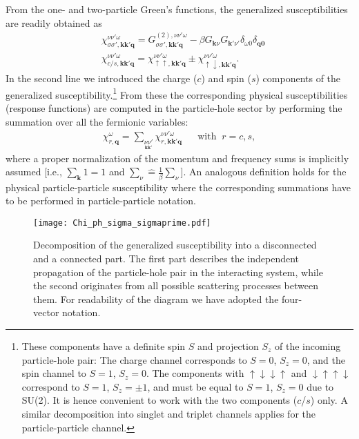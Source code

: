 \documentclass[rmp,aps,reprint,amsmath,amssymb,superscriptaddress,showpacs,nofootinbib]{revtex4-1}
\begin{document}
From the one- and two-particle Green's functions, the generalized  susceptibilities are readily obtained as
\begin{align} 
 \label{equ:defgensusc} 
 &\chi_{\sigma\sigma',\mathbf{k}\mathbf{k'}\mathbf{q}}^{\nu\nu'\omega}=G_{\sigma\sigma',\mathbf{k}\mathbf{k'}\mathbf{q}}^{(2),\nu\nu'\omega}-\beta G_{\mathbf{k}\nu}G_{\mathbf{k'}\nu'}\delta_{\omega 0}\delta_{\mathbf{q}\mathbf{0}}\nonumber\\
 &\chi_{c/s,\mathbf{k}\mathbf{k'}\mathbf{q}}^{\nu\nu'\omega}=\chi_{\uparrow\uparrow,\mathbf{k}\mathbf{k'}\mathbf{q}}^{\nu\nu'\omega}\pm\chi_{\uparrow\downarrow,\mathbf{k}\mathbf{k'}\mathbf{q}}^{\nu\nu'\omega}. 
\end{align}
In the second line we introduced the charge ($c$) and spin ($s$)  components of the generalized susceptibility.\footnote{These components have a definite spin $S$ and projection $S_z$ of the incoming particle-hole pair: The charge channel corresponds to $S=0$, $S_{z}=0$, and the spin channel to $S=1$, $S_{z}=0$. The components with $\uparrow\downarrow\downarrow\uparrow$ and $\downarrow\uparrow\uparrow\downarrow$ correspond to $S=1$, $S_{z}=\pm 1$, and must be equal to $S=1$, $S_{z}=0$ due to SU(2). It is hence convenient to work with the two components  ($c$/$s$) only. A similar decomposition into singlet and triplet channels applies for the particle-particle channel.} From these  the corresponding physical susceptibilities (response functions) are computed in the particle-hole sector by performing the summation over all the fermionic variables: 
\begin{align} 
 \label{equ:defphyssusc} 
 \chi_{r,\mathbf{q}}^{\omega}=\sum_{\underset{\mathbf{k}\mathbf{k'}}{\nu\nu'}}\chi_{r,\mathbf{k}\mathbf{k'}\mathbf{q}}^{\nu\nu'\omega} &  & \mbox{with} \; \; r = c,s,
\end{align}
where a proper normalization of the momentum and frequency sums is implicitly assumed [i.e., $\sum_{\mathbf{k}} 1= 1$ and $\sum_{\nu}\widehat{=}\frac{1}{\beta}\sum_\nu$]. An analogous definition holds for the physical particle-particle susceptibility where the corresponding summations have to be performed in particle-particle notation.

\begin{figure} 
  \centering 
  \texttt{[image: Chi\_ph\_sigma\_sigmaprime.pdf]} 
    \caption{Decomposition of the generalized susceptibility into a disconnected and a connected part. The first part describes the independent propagation of the particle-hole pair in the interacting system, while the second originates from all possible scattering processes between them. For readability of the diagram we have adopted the four-vector notation.}
  \label{fig:decomp1PIF} 
\end{figure} 
\end{document}
